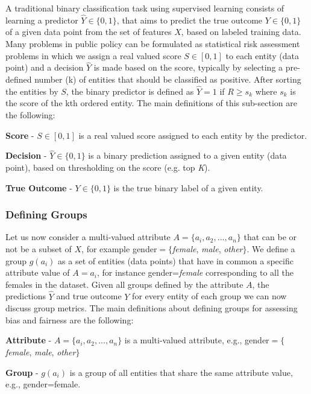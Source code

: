 A traditional binary classification task using supervised learning consists of learning a predictor $\widehat{Y} \in \{0,1\}$, that aims to predict the true outcome $Y \in \{0,1\}$ of a given data point from the set of features $X$, based on labeled training data. Many problems in public policy can be formulated as statistical risk assessment problems in which we assign a real valued score $S \in [0,1]$ to each entity (data point) and a decision $\widehat{Y}$ is made based on the score, typically by selecting a pre-defined number (k) of entities that should be classified as positive. After sorting the entities by $S$, the binary predictor is defined as  $\widehat{Y}=1$ if $R \geq s_k$ where $s_k$ is the score of the kth ordered entity.
The main definitions of this sub-section are the following:

\textbf{Score} - $S \in [0,1]$ is a real valued score assigned to each entity by the predictor. 

\textbf{Decision} - $\widehat{Y} \in \{0,1\}$ is a binary prediction assigned to a given entity (data point), based on thresholding on the score (e.g. top \textit{K}).                       

\textbf{True Outcome} - $Y \in \{0,1\}$ is the true binary label of a given entity.          

\subsubsection{Defining Groups}

Let us now consider a multi-valued attribute $A = \{a_i, a_2,...,a_n\}$ that can be or not be a subset of $X$, for example gender$=\{$\textit{female}, \textit{male}, \textit{other}$\}$. We define a group $g(a_i)$ as a set of entities (data points) that have in common a specific attribute value of $A=a_i$, for instance gender=\textit{female} corresponding to all the females in the dataset. Given all groups defined by the attribute $A$, the predictions $\widehat{Y}$ and true outcome $Y$ for every entity of each group we can now discuss group metrics. 
The main definitions about defining groups for assessing bias and fairness are the following:

\textbf{Attribute} - $A = \{a_i, a_2,...,a_n\}$ is a multi-valued attribute, e.g., gender$=\{$\textit{female}, \textit{male}, \textit{other}$\}$    

\textbf{Group} - $g(a_i)$ is a group of all entities that share the same attribute value, e.g., gender=female.

